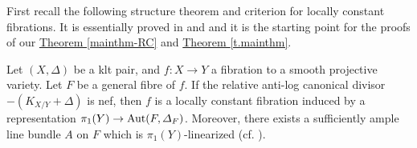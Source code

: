 First recall the following structure theorem and criterion for locally constant fibrations. It is essentially proved in \cite{CCM19} and \cite{MW21} and it is the starting point for the proofs of our {\hyperref[mainthm-RC]{Theorem \ref*{mainthm-RC}}} and {\hyperref[t.mainthm]{Theorem \ref*{t.mainthm}}}.

\begin{thm}	\label{t.structureantinef}
Let $(X,\Delta)$ be a klt pair, and  $f:X\rightarrow Y$ a fibration to a smooth projective variety. Let $F$ be a general fibre of $f$. If the relative anti-log canonical divisor $-(K_{X/Y}+\Delta)$ is nef, then  $f$ is a locally constant fibration induced by a  representation $\pi_1(Y)\rightarrow \operatorname{Aut}(F,\varDelta_F)$. Moreover, there exists a sufficiently ample line bundle $A$ on $F$  which is $\pi_1(Y)$-linearized (cf. \cite[Defintion 3.2.3, Lemma 3.2.4]{Brion18}). 
\end{thm}


